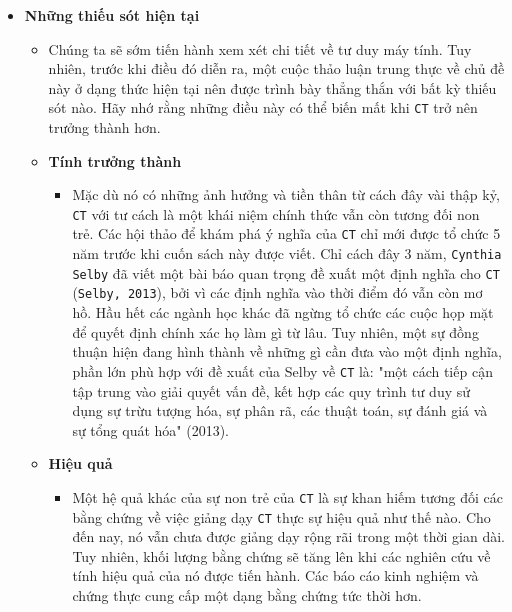 \begin{itemize}
    \item \textbf{Những thiếu sót hiện tại}
    \begin{itemize}
        \item Chúng ta sẽ sớm tiến hành xem xét chi tiết về tư duy máy tính. Tuy nhiên, trước khi điều đó diễn ra, một cuộc thảo luận trung thực về chủ đề này ở dạng thức hiện tại nên được trình bày thẳng thắn với bất kỳ thiếu sót nào. Hãy nhớ rằng những điều này có thể biến mất khi \texttt{CT} trở nên trưởng thành hơn.

        \item \textbf{Tính trưởng thành}
        \begin{itemize}
            \item Mặc dù nó có những ảnh hưởng và tiền thân từ cách đây vài thập kỷ, \texttt{CT} với tư cách là một khái niệm chính thức vẫn còn tương đối non trẻ. Các hội thảo để khám phá ý nghĩa của \texttt{CT} chỉ mới được tổ chức 5 năm trước khi cuốn sách này được viết. Chỉ cách đây 3 năm, \texttt{Cynthia Selby} đã viết một bài báo quan trọng đề xuất một định nghĩa cho \texttt{CT} (\texttt{Selby, 2013}), bởi vì các định nghĩa vào thời điểm đó vẫn còn mơ hồ. Hầu hết các ngành học khác đã ngừng tổ chức các cuộc họp mặt để quyết định chính xác họ làm gì từ lâu. Tuy nhiên, một sự đồng thuận hiện đang hình thành về những gì cần đưa vào một định nghĩa, phần lớn phù hợp với đề xuất của Selby về \texttt{CT} là: "một cách tiếp cận tập trung vào giải quyết vấn đề, kết hợp các quy trình tư duy sử dụng sự trừu tượng hóa, sự phân rã, các thuật toán, sự đánh giá và sự tổng quát hóa" (2013). 
        \end{itemize}

        \item \textbf{Hiệu quả}
        \begin{itemize}
            \item Một hệ quả khác của sự non trẻ của \texttt{CT} là sự khan hiếm tương đối các bằng chứng về việc giảng dạy \texttt{CT} thực sự hiệu quả như thế nào. Cho đến nay, nó vẫn chưa được giảng dạy rộng rãi trong một thời gian dài. Tuy nhiên, khối lượng bằng chứng sẽ tăng lên khi các nghiên cứu về tính hiệu quả của nó được tiến hành. Các báo cáo kinh nghiệm và chứng thực cung cấp một dạng bằng chứng tức thời hơn.
        \end{itemize}


\end{itemize}
\end{itemize}
